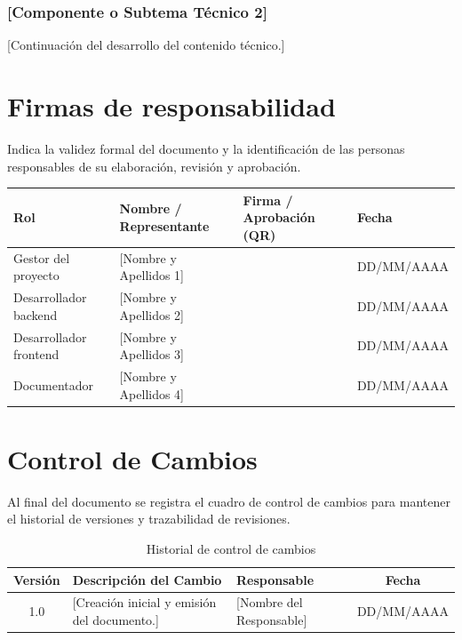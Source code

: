 \documentclass[10pt,letterpaper]{article}
\newcommand{\FechaElaboracion}{DD/MM/AAAA}
\newcommand{\FechaRevision}{DD/MM/AAAA}
\begin{document}
\subsubsection{[Componente o Subtema Técnico 2]}

[Continuación del desarrollo del contenido técnico.]

\section{Firmas de responsabilidad}

Indica la validez formal del documento y la identificación de las personas responsables de su elaboración, revisión y aprobación.

\begin{center}
\renewcommand{\arraystretch}{2.4}
\begin{tabular}{p{3.8cm}p{4.2cm}>{\centering\arraybackslash}p{4.0cm}>{\centering\arraybackslash}p{2.8cm}}
\toprule
\textbf{Rol} & \textbf{Nombre / Representante} & \textbf{Firma / Aprobación (QR)} & \textbf{Fecha} \\
\midrule
Gestor del proyecto & {[Nombre y Apellidos 1]} & & \FechaElaboracion \\
Desarrollador backend & {[Nombre y Apellidos 2]} & & \FechaElaboracion \\
Desarrollador frontend & {[Nombre y Apellidos 3]} & & \FechaElaboracion \\
Documentador & {[Nombre y Apellidos 4]} & & \FechaRevision \\
\bottomrule
\end{tabular}
\end{center}

\section{Control de Cambios}

Al final del documento se registra el cuadro de control de cambios para mantener el historial de versiones y trazabilidad de revisiones.

\begin{table}[htbp]
\centering
\caption{Historial de control de cambios}
\label{tab:control_cambios}
\renewcommand{\arraystretch}{1.25}
\begin{tabular}{|c|p{8.0cm}|p{3.8cm}|c|}
\hline
\textbf{Versión} & \textbf{Descripción del Cambio} & \textbf{Responsable} & \textbf{Fecha} \\ \hline
1.0 & [Creación inicial y emisión del documento.] & {[Nombre del Responsable]} & \FechaElaboracion \\ \hline
\end{tabular}
\end{table}
\end{document}
